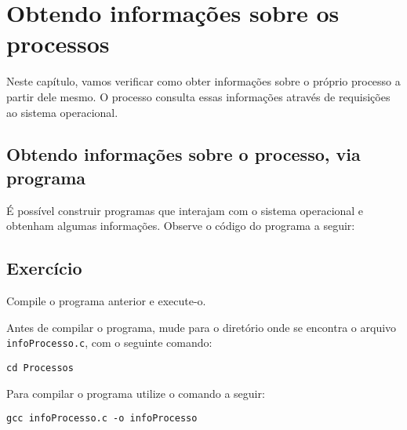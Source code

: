 \chapter{Obtendo informações sobre os processos}
Neste capítulo, vamos verificar como obter informações sobre o próprio processo a partir dele mesmo. O processo consulta essas informações através de requisições ao sistema operacional.

\section{Obtendo informações sobre o processo, via programa}
É possível construir programas que interajam com o sistema operacional e obtenham algumas informações. Observe o código do programa a seguir:



\section{Exercício}
Compile o programa anterior e execute-o.

Antes de compilar o programa, mude para o diretório onde se encontra o arquivo  \texttt{infoProcesso.c}, com o seguinte comando:

\begin{lstlisting}[style=MyBashStyle]
cd Processos
\end{lstlisting}

Para compilar o programa utilize o comando a seguir:
\begin{lstlisting}[style=MyBashStyle]
gcc infoProcesso.c -o infoProcesso
\end{lstlisting}